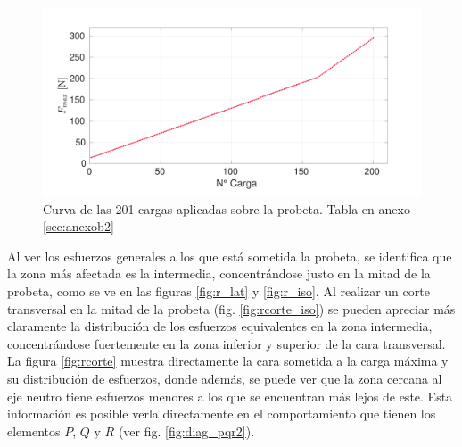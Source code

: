 \begin{figure}[h]
\centering
\includegraphics[width=1\linewidth, trim={1cm 0cm 1cm 0cm}, clip]{Imagenes/fmax_step.pdf}
\caption{Curva de las 201 cargas aplicadas sobre la probeta. Tabla en anexo \ref{sec:anexob2}}
\label{fig:fmax_step}
\end{figure}

Al ver los esfuerzos generales a los que está sometida la probeta, se identifica que la zona más afectada es la intermedia, concentrándose justo en la mitad de la probeta, como se ve en las figuras \ref{fig:r_lat} y \ref{fig:r_iso}. Al realizar un corte transversal en la mitad de la probeta (fig. \ref{fig:rcorte_iso}) se pueden apreciar más claramente la distribución de los esfuerzos equivalentes en la zona intermedia, concentrándose fuertemente en la zona inferior y superior de la cara transversal. La figura \ref{fig:rcorte} muestra directamente la cara sometida a la carga máxima y su distribución de esfuerzos, donde además, se puede ver que la zona cercana al eje neutro tiene esfuerzos menores a los que se encuentran más lejos de este. Esta información es posible verla directamente en el comportamiento que tienen los elementos  $P$, $Q$ y $R$ (ver fig. \ref{fig:diag_pqr2}).

